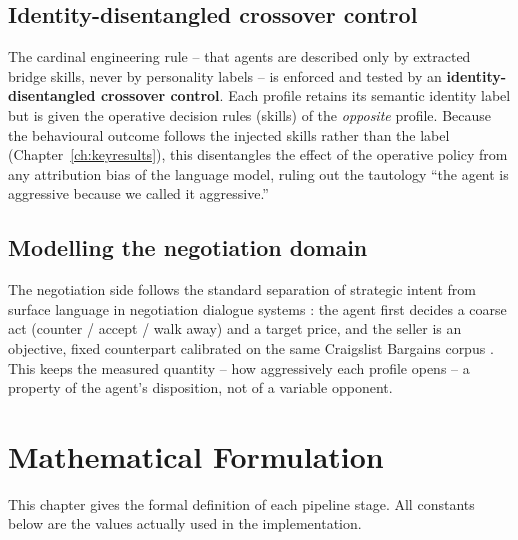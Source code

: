 \documentclass[11pt, a4paper, oneside, openany]{report}
\begin{document}
\section{Identity-disentangled crossover control}
The cardinal engineering rule -- that agents are described only by extracted
bridge skills, never by personality labels -- is enforced and tested by an
\textbf{identity-disentangled crossover control}. Each profile retains its
semantic identity label but is given the operative decision rules (skills) of
the \emph{opposite} profile. Because the behavioural outcome follows the
injected skills rather than the label (Chapter~\ref{ch:keyresults}), this
disentangles the effect of the operative policy from any attribution bias of
the language model, ruling out the tautology ``the agent is aggressive because
we called it aggressive.''

\section{Modelling the negotiation domain}
The negotiation side follows the standard separation of strategic intent from
surface language in negotiation dialogue systems \cite{he2018}: the agent first
decides a coarse act (counter / accept / walk away) and a target price, and the
seller is an objective, fixed counterpart calibrated on the same Craigslist
Bargains corpus \cite{he2018}. This keeps the measured quantity -- how
aggressively each profile opens -- a property of the agent's disposition, not
of a variable opponent.

\chapter{Mathematical Formulation}
\label{ch:math}

This chapter gives the formal definition of each pipeline stage. All constants
below are the values actually used in the implementation.
\end{document}
